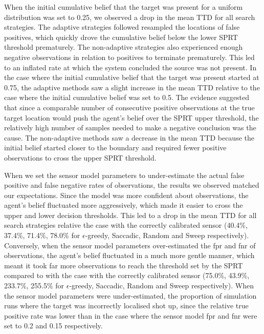 When the initial cumulative belief that the target was present for a uniform distribution was set to 0.25, we observed a drop in the mean TTD for all search strategies. The adaptive strategies followed resampled the locations of false positives, which quickly drove the cumulative belief below the lower SPRT threshold prematurely. The non-adaptive strategies also experienced enough negative observations in relation to positives to terminate prematurely. This led to an inflated rate at which the system concluded the source was not present. In the case where the initial cumulative belief that the target was present started at 0.75, the adaptive methods saw a slight increase in the mean TTD relative to the case where the initial cumulative belief was set to 0.5. The evidence suggested that since a comparable number of consecutive positive observations at the true target location would push the agent's belief over the SPRT upper threshold, the relatively high number of samples needed to make a negative conclusion was the cause. The non-adaptive methods saw a decrease in the mean TTD because the initial belief started closer to the boundary and required  fewer positive observations to cross the upper SPRT threshold.\par


When we set the sensor model parameters to under-estimate the actual false positive and false negative rates of observations, the results we observed matched our expectations. Since the model was more confident about observations, the agent's belief fluctuated more aggressively, which made it easier to cross the upper and lower decision thresholds. This led to a drop in the mean TTD for all search strategies relative the case with the correctly calibrated sensor (40.4\%, 37.4\%, 71.4\%, 78.0\% for $\epsilon$-greedy, Saccadic, Random and Sweep respectively). Conversely, when the sensor model parameters over-estimated the fpr and fnr of observations, the agent's belief fluctuated in a much more gentle manner, which meant it took far more observations to reach the threshold set by the SPRT compared to with the case with the correctly calibrated sensor (75.0\%, 43.9\%, 233.7\%, 255.5\% for $\epsilon$-greedy, Saccadic, Random and Sweep respectively). When the sensor model parameters were under-estimated, the proportion of simulation runs where the target was incorrectly localised shot up, since the relative true positive rate was lower than in the case where the sensor model fpr and fnr were set to 0.2 and 0.15 respectively.\par


